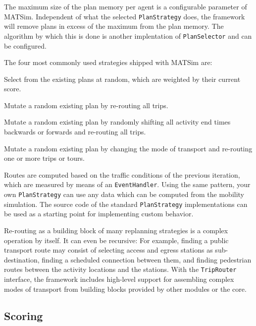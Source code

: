 The maximum size of the plan memory per agent is a configurable parameter of MATSim. Independent
 of what the selected \lstinline$PlanStrategy$ does, the framework will remove plans in excess
 of the maximum from the plan memory. The algorithm by which this is done is another implentation
 of \lstinline$PlanSelector$ and can be configured. 

The four most commonly used strategies shipped with MATSim are:

\begin{compactitem}
\item Select from the existing plans at random, which are weighted by their current score.
\item Mutate a random existing plan by re-routing all trips.
\item Mutate a random existing plan by randomly shifting all activity end times backwards or forwards and re-routing 
all trips.
\item Mutate a random existing plan by changing the mode of transport and re-routing one or more trips or tours.
\end{compactitem}

Routes are computed based on the traffic conditions of the previous iteration, which are measured
by means of an \lstinline$EventHandler$. Using the same pattern, your own \lstinline$PlanStrategy$ can use any data which
can be computed from the mobility simulation. The source code of the standard \lstinline$PlanStrategy$ implementations can be 
used as a starting point for implementing custom behavior.

Re-routing as a building block of many replanning strategies is a complex operation by itself. It can
even be recursive: For example, finding a public transport route may consist of selecting access and egress stations as
sub-destination, finding a scheduled connection between them, and finding pedestrian routes between the
activity locations and the stations. With the \lstinline$TripRouter$ interface, the framework includes high-level 
support for assembling complex modes of transport from building blocks provided by other modules or the core. 
  

\subsection{Scoring}
\label{sec:scoring-extension-point}

